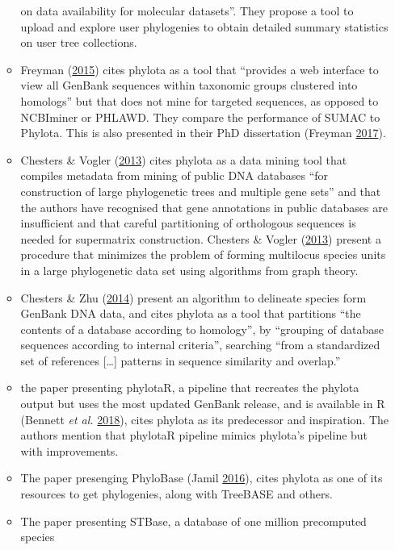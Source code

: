 \documentclass[]{article}
\begin{document}
\begin{enumerate}
\begin{itemize}
    on data availability for molecular datasets''. They propose a tool to upload and
    explore user phylogenies to obtain detailed summary statistics on user tree collections.
  \item
    Freyman (\protect\hyperlink{ref-freyman2015sumac}{2015}) cites phylota as a tool that ``provides a web interface to view
    all GenBank sequences within taxonomic groups clustered into homologs'' but that
    does not mine for targeted sequences, as opposed to NCBIminer or PHLAWD. They
    compare the performance of SUMAC to Phylota. This is also presented in their PhD dissertation (Freyman \protect\hyperlink{ref-freyman2017phylogenetic}{2017}).
  \item
    Chesters \& Vogler (\protect\hyperlink{ref-chesters2013resolving}{2013}) cites phylota as a data mining tool that compiles metadata
    from mining of public DNA databases ``for construction of large phylogenetic trees
    and multiple gene sets'' and that the authors have recognised that gene annotations
    in public databases are insufficient and that careful partitioning of orthologous
    sequences is needed for supermatrix construction. Chesters \& Vogler (\protect\hyperlink{ref-chesters2013resolving}{2013}) present
    a procedure that minimizes the problem of forming multilocus species units in
    a large phylogenetic data set using algorithms from graph theory.
  \item
    Chesters \& Zhu (\protect\hyperlink{ref-chesters2014protocol}{2014}) present an algorithm to delineate species form GenBank
    DNA data, and cites phylota as a tool that partitions ``the contents of a database
    according to homology'', by ``grouping of database sequences according to internal
    criteria'', searching ``from a standardized set of references {[}\ldots{}{]} patterns in
    sequence similarity and overlap.''
  \item
    the paper presenting phylotaR, a pipeline that recreates the phylota output
    but uses the most updated GenBank release, and is available in R (Bennett \emph{et al.} \protect\hyperlink{ref-bennett2018phylotar}{2018}),
    cites phylota as its predecessor and inspiration. The authors mention that phylotaR
    pipeline mimics phylota's pipeline but with improvements.
  \item
    The paper presenging PhyloBase (Jamil \protect\hyperlink{ref-jamil2016visual}{2016}), cites phylota as one of
    its resources to get phylogenies, along with TreeBASE and others.
  \item
    The paper presenting STBase, a database of one million precomputed species

\end{itemize}
\end{enumerate}
\end{document}
